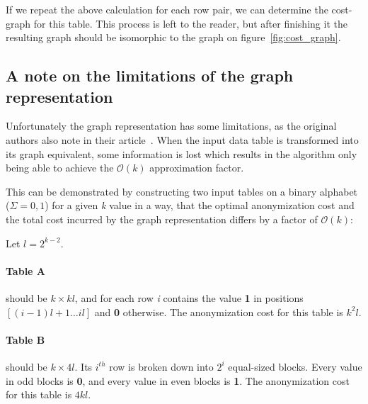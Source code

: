 If we repeat the above calculation for each row pair, we can determine the cost-graph for this table.
This process is left to the reader, but after finishing it the resulting graph should be isomorphic to the graph on figure~\ref{fig:cost_graph}.

\vspace{\baselineskip}


\subsection{A note on the limitations of the graph representation}\label{subsec:a-note-on-the-limitations-of-the-graph-representation}

Unfortunately the graph representation has some limitations, as the original authors also note in their article~\cite{aggarwal}.
When the input data table is transformed into its graph equivalent, some information is lost which results in the algorithm only being able to achieve the \(\mathcal{O}(k)\) approximation factor.

This can be demonstrated by constructing two input tables on a binary alphabet (\(\Sigma={0,1}\)) for a given \textit{k} value in a way, that the optimal anonymization cost and the total cost incurred by the graph representation differs by a factor of \(\mathcal{O}(k)\):

Let \(l=2^{k-2}\).

\paragraph{Table A} should be \(k \times kl\), and for each row \textit{i} contains the value \textbf{1} in positions \([(i-1)l+1 \dots il]\) and \textbf{0} otherwise.
The anonymization cost for this table is \(k^2 l\).

\vspace{\baselineskip}


\paragraph{Table B} should be \(k \times 4l\).
Its \(i^{th}\) row is broken down into \(2^i\) equal-sized blocks.
Every value in odd blocks is \textbf{0}, and every value in even blocks is \textbf{1}.
The anonymization cost for this table is \(4kl\).

\vspace{\baselineskip}


